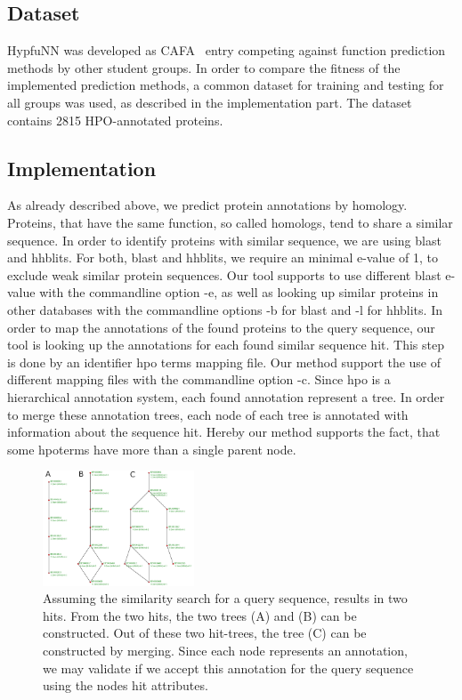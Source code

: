 \subsection{Dataset}

HypfuNN was developed as CAFA~\citep{CAFA} entry competing against function prediction methods by other student groups. In order to compare the fitness of the implemented prediction methods, a common
dataset for training and testing for all groups was used, as described in the implementation part. The dataset contains 2815 HPO-annotated proteins.

\subsection{Implementation}

As already described above, we predict protein annotations by homology. Proteins, that have the same function, so called homologs, tend to share a similar sequence. In order to identify proteins
with similar sequence, we are using blast and hhblits. For both, blast and hhblits, we require an minimal e-value of 1, to exclude weak similar protein sequences. Our tool supports to use
different blast e-value with the commandline option -e, as well as looking up similar proteins in other databases with the commandline options -b for blast and -l for hhblits.\newline
In order to map the annotations of the found proteins to the query sequence, our tool is looking up the annotations for each found similar sequence hit. This step is done by an identifier hpo terms mapping
file. Our method support the use of different mapping files with the commandline option -c.\newline
Since hpo is a hierarchical annotation system, each found annotation represent a tree. In order to merge these annotation trees, each node of each tree is annotated with information about the sequence
hit. Hereby our method supports the fact, that some hpoterms have more than a single parent node.\newline
\begin{figure}[!hb]
\includegraphics[width = 0.4\textwidth]{figures/merge_trees.png}
\caption{Assuming the similarity search for a query sequence, results in two hits. From the two hits, the two trees (A) and (B) can be constructed. Out of these two hit-trees, the tree (C) can be
constructed by merging. Since each node represents an annotation, we may validate if we accept this annotation for the query sequence using the nodes hit attributes.}
\label{fig:function_transfer}
\end{figure}
